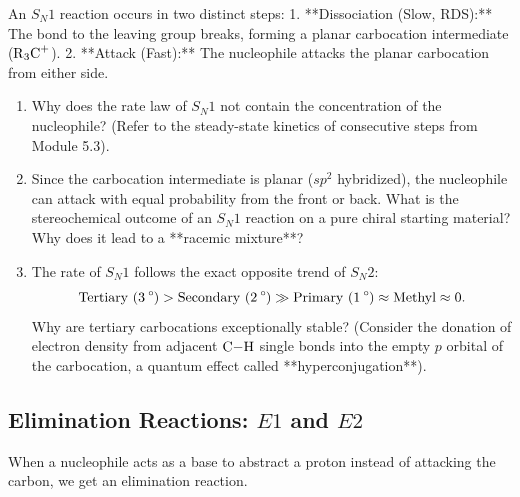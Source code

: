 \documentclass[12pt, a4paper]{book}
\begin{document}
\begin{explobox}
An $S_N1$ reaction occurs in two distinct steps:
1. **Dissociation (Slow, RDS):** The bond to the leaving group breaks, forming a planar carbocation intermediate ($\ce{R3C+}$).
2. **Attack (Fast):** The nucleophile attacks the planar carbocation from either side.
\begin{enumerate}[label=(\alph*), leftmargin=*]
  \item Why does the rate law of $S_N1$ not contain the concentration of the nucleophile? (Refer to the steady-state kinetics of consecutive steps from Module 5.3).
  \item Since the carbocation intermediate is planar ($sp^2$ hybridized), the nucleophile can attack with equal probability from the front or back.
        What is the stereochemical outcome of an $S_N1$ reaction on a pure chiral starting material? Why does it lead to a **racemic mixture**?
  \item The rate of $S_N1$ follows the exact opposite trend of $S_N2$:
  \[
    \text{Tertiary } (\ce{3^\circ}) > \text{Secondary } (\ce{2^\circ}) \gg \text{Primary } (\ce{1^\circ}) \approx \text{Methyl} \approx 0.
  \]
  Why are tertiary carbocations exceptionally stable? (Consider the donation of electron density from adjacent $\ce{C-H}$ single bonds into the empty $p$ orbital of the carbocation, a quantum effect called **hyperconjugation**).
\end{enumerate}
\end{explobox}

\subsection{Elimination Reactions: $E1$ and $E2$}

When a nucleophile acts as a base to abstract a proton instead of attacking the carbon, we get an elimination reaction.
\end{document}
